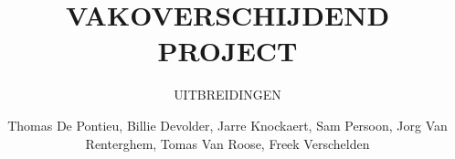\documentclass[a4paper, twoside, 12pt]{ugent_report}
\begin{document}
\title{VAKOVERSCHIJDEND PROJECT}
\subtitle{UITBREIDINGEN\\}
\author{Thomas De Pontieu, Billie Devolder, Jarre Knockaert, Sam Persoon, Jorg Van Renterghem, Tomas Van Roose, Freek Verschelden}
\maketitle

\restoregeometry
\newpage\null\thispagestyle{empty}\newpage
\end{document}
